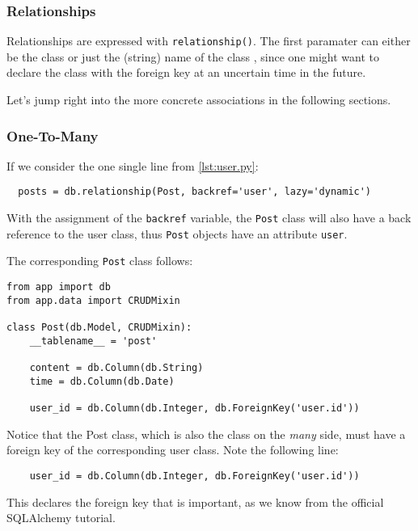 \documentclass[../main/main.tex]{subfiles}
\begin{document}
\subsubsection{Relationships}
\label{sec:relationships}

Relationships are expressed with \lstinline|relationship()|. The
first paramater can either be the class or just the (string) name of the
class \cite{mitsuhiko:declare_models}, since one might want to declare
the class with the foreign key at an uncertain time in the future. 

Let's jump right into the more concrete associations in the following
sections. 

\subsubsection{One-To-Many}
\label{sec:onetomany}

If we consider the one single line from \ref{lst:user.py}:

\begin{lstlisting}
  posts = db.relationship(Post, backref='user', lazy='dynamic')  
\end{lstlisting}

With the assignment of the \lstinline|backref| variable, the
\lstinline|Post| class will also have a back reference to the user
class, thus \lstinline|Post| objects have an attribute \lstinline|user|.

The corresponding \lstinline|Post| class follows: 

\begin{lstlisting}[caption=app/models/post.py, label=post.py]
from app import db
from app.data import CRUDMixin

class Post(db.Model, CRUDMixin):
    __tablename__ = 'post'

    content = db.Column(db.String)
    time = db.Column(db.Date)

    user_id = db.Column(db.Integer, db.ForeignKey('user.id'))
\end{lstlisting}

Notice that the Post class, which is also the class on the
\textit{many} side, must have a foreign key of the corresponding user
class. Note the following line: 

\begin{lstlisting}
    user_id = db.Column(db.Integer, db.ForeignKey('user.id'))  
\end{lstlisting}

This declares the foreign key that is important, as we know from the
official SQLAlchemy tutorial. 
\end{document}
